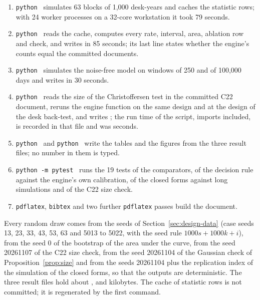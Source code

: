 \begin{enumerate}
\item \texttt{python}~ simulates 63 blocks of 1,000 desk-years and caches the statistic rows; with 24 worker processes on a 32-core workstation it took 79 seconds.
\item \texttt{python}~ reads the cache, computes every rate, interval, area, ablation row and check, and writes  in 85 seconds; its last line states whether the engine's counts equal the committed documents.
\item \texttt{python}~ simulates the noise-free model on windows of 250 and of 100,000 days and writes  in 30 seconds.
\item \texttt{python}~ reads the size of the Christoffersen test in the committed C22 document, reruns the engine function on the same design and at the design of the desk back-test, and writes ; the run time of the script, imports included, is recorded in that file and was \ccheckSeconds{} seconds.
\item \texttt{python}~ and \texttt{python}~ write the tables and the figures from the three result files; no number in them is typed.
\item \texttt{python -m pytest}~ runs the 19 tests of the comparators, of the decision rule against the engine's own calibration, of the closed forms against long simulations and of the C22 size check.
\item \texttt{pdflatex}, \texttt{bibtex} and two further \texttt{pdflatex} passes build the document.
\end{enumerate}
Every random draw comes from the seeds of Section~\ref{sec:design-data} (case seeds 13, 23, 33, 43, 53, 63 and 5013 to 5022, with the seed rule $1000s+1000k+i$), from the seed 0 of the bootstrap of the area under the curve, from the seed 20261107 of the C22 size check, from the seed 20261104 of the Gaussian check of Proposition~\ref{prop:size} and from the seeds 20261104 plus the replication index of the simulation of the closed forms, so that the outputs are deterministic.
The three result files hold about \resultsKB, \theoryKB{} and \ccheckKB{} kilobytes.
The cache of statistic rows is not committed; it is regenerated by the first command.
